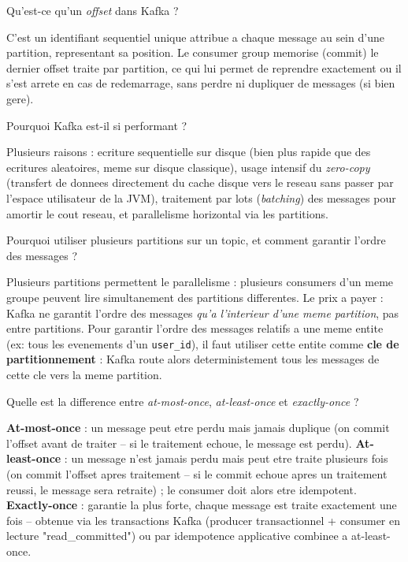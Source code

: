 \documentclass[11pt,a4paper]{article}
\begin{document}
\begin{question} Qu'est-ce qu'un \emph{offset} dans Kafka ?
\end{question}
\begin{reponse}
C'est un identifiant sequentiel unique attribue a chaque message au sein d'une partition, representant sa position. Le consumer group memorise (commit) le dernier offset traite par partition, ce qui lui permet de reprendre exactement ou il s'est arrete en cas de redemarrage, sans perdre ni dupliquer de messages (si bien gere).
\end{reponse}

\begin{question} Pourquoi Kafka est-il si performant ?
\end{question}
\begin{reponse}
Plusieurs raisons : ecriture sequentielle sur disque (bien plus rapide que des ecritures aleatoires, meme sur disque classique), usage intensif du \emph{zero-copy} (transfert de donnees directement du cache disque vers le reseau sans passer par l'espace utilisateur de la JVM), traitement par lots (\emph{batching}) des messages pour amortir le cout reseau, et parallelisme horizontal via les partitions.
\end{reponse}

\begin{question} Pourquoi utiliser plusieurs partitions sur un topic, et comment garantir l'ordre des messages ?
\end{question}
\begin{reponse}
Plusieurs partitions permettent le parallelisme : plusieurs consumers d'un meme groupe peuvent lire simultanement des partitions differentes. Le prix a payer : Kafka ne garantit l'ordre des messages \emph{qu'a l'interieur d'une meme partition}, pas entre partitions. Pour garantir l'ordre des messages relatifs a une meme entite (ex: tous les evenements d'un \texttt{user\_id}), il faut utiliser cette entite comme \textbf{cle de partitionnement} : Kafka route alors deterministe­ment tous les messages de cette cle vers la meme partition.
\end{reponse}

\begin{question} Quelle est la difference entre \emph{at-most-once}, \emph{at-least-once} et \emph{exactly-once} ?
\end{question}
\begin{reponse}
\textbf{At-most-once} : un message peut etre perdu mais jamais duplique (on commit l'offset avant de traiter -- si le traitement echoue, le message est perdu). \textbf{At-least-once} : un message n'est jamais perdu mais peut etre traite plusieurs fois (on commit l'offset apres traitement -- si le commit echoue apres un traitement reussi, le message sera retraite) ; le consumer doit alors etre idempotent. \textbf{Exactly-once} : garantie la plus forte, chaque message est traite exactement une fois -- obtenue via les transactions Kafka (producer transactionnel + consumer en lecture "read\_committed") ou par idempotence applicative combinee a at-least-once.
\end{reponse}
\end{document}
